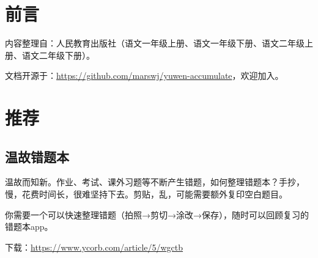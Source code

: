 \chapter{前言}
内容整理自：人民教育出版社（语文一年级上册、语文一年级下册、语文二年级上册、语文二年级下册）。

文档开源于：\url{https://github.com/marswj/yuwen-accumulate}，欢迎加入。

\chapter{推荐}
\section{温故错题本}
温故而知新。作业、考试、课外习题等不断产生错题，如何整理错题本？手抄，慢，花费时间长，很难坚持下去。剪贴，乱，可能需要额外复印空白题目。

你需要一个可以快速整理错题（拍照→剪切→涂改→保存），随时可以回顾复习的错题本app。

下载：\url{https://www.ycorb.com/article/5/wgctb}
